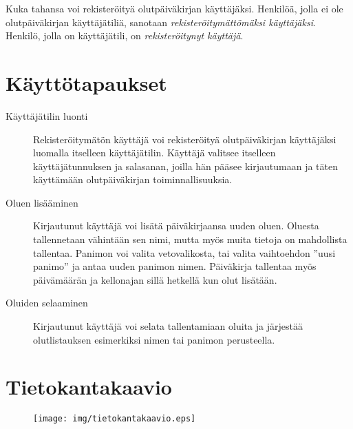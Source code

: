 \documentclass[12pt]{amsart}
\begin{document}
Kuka tahansa voi rekisteröityä olutpäiväkirjan käyttäjäksi. Henkilöä, jolla ei ole olutpäiväkirjan käyttäjätiliä, sanotaan \emph{rekisteröitymättömäksi käyttäjäksi}. Henkilö, jolla on käyttäjätili, on \emph{rekisteröitynyt käyttäjä}.

\section{Käyttötapaukset}

\begin{description}
\item[Käyttäjätilin luonti] Rekisteröitymätön käyttäjä voi rekisteröityä olutpäiväkirjan käyttäjäksi luomalla itselleen käyttäjätilin. Käyttäjä valitsee itselleen käyttäjätunnuksen ja salasanan, joilla hän pääsee kirjautumaan ja täten käyttämään olutpäiväkirjan toiminnallisuuksia.

\item[Oluen lisääminen] Kirjautunut käyttäjä voi lisätä päiväkirjaansa uuden oluen. Oluesta tallennetaan vähintään sen nimi, mutta myös muita tietoja on mahdollista tallentaa. Panimon voi valita vetovalikosta, tai valita vaihtoehdon ''uusi panimo'' ja antaa uuden panimon nimen. Päiväkirja tallentaa myös päivämäärän ja kellonajan sillä hetkellä kun olut lisätään.

\item[Oluiden selaaminen] Kirjautunut käyttäjä voi selata tallentamiaan oluita ja järjestää olutlistauksen esimerkiksi nimen tai panimon perusteella.

\end{description}

\section{Tietokantakaavio}

\begin{figure}[H]
  \centering
  \texttt{[image: img/tietokantakaavio.eps]}
\end{figure}
\end{document}
